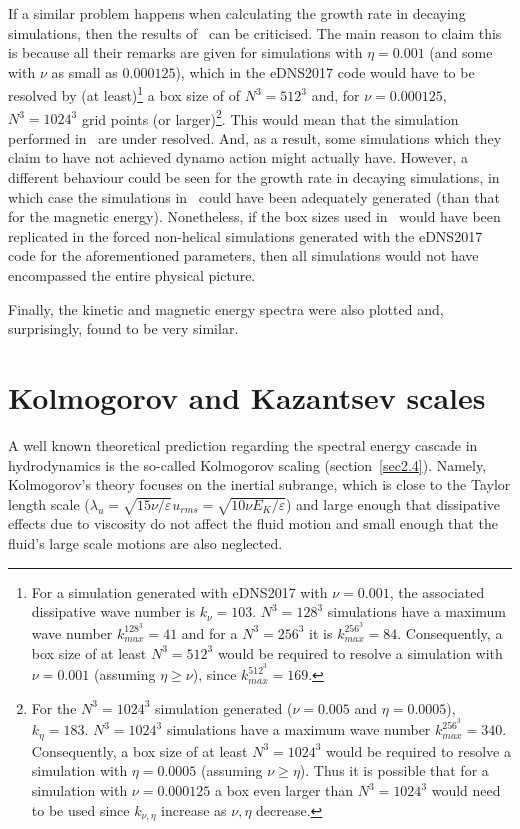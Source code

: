 \documentclass[12pt,a4paper]{report}
\begin{document}
If a similar problem happens when calculating the growth rate in decaying simulations, then the results of~\cite{schekochihin2004critical} can be criticised. The main reason to claim this is because all their remarks are given for simulations with $\eta=0.001$ (and some with $\nu$ as small as $0.000125$), which in the eDNS2017 code would have to be resolved by (at least)\footnote{For a simulation generated with eDNS2017 with $\nu=0.001$, the associated dissipative wave number is $k_\nu=103$. $N^3=128^3$ simulations have a maximum wave number $k_{max}^{128^3}=41$ and for a $N^3=256^3$ it is $k_{max}^{256^3}=84$. Consequently, a box size of at least $N^3=512^3$ would be required to resolve a simulation with $\nu=0.001$ (assuming $\eta \geq \nu$), since $k_{max}^{512^3}=169$.} a box size of of $N^3=512^3$ and, for $\nu=0.000125$, $N^3=1024^3$ grid points (or larger)\footnote{For the $N^3=1024^3$ simulation generated ($\nu=0.005$ and $\eta=0.0005$), $k_\eta=183$. $N^3=1024^3$ simulations have a maximum wave number $k_{max}^{256^3}=340$. Consequently, a box size of at least $N^3=1024^3$ would be required to resolve a simulation with $\eta=0.0005$ (assuming $\nu \geq \eta$). Thus it is possible that for a simulation with $\nu=0.000125$ a box even larger than $N^3=1024^3$ would need to be used since $k_{\nu, \eta}$ increase as $\nu, \eta$ decrease.}. This would mean that the simulation performed in~\cite{schekochihin2004critical} are under resolved. And, as a result, some simulations which they claim to have not achieved dynamo action might actually have.  However, a different behaviour could be seen for the growth rate in decaying simulations, in which case the simulations in~\cite{schekochihin2004critical} could have been adequately generated (than that for the magnetic energy). Nonetheless, if the box sizes used in~\cite{schekochihin2004critical} would have been replicated in the forced non-helical simulations generated with the eDNS2017 code for the aforementioned parameters, then all simulations would not have encompassed the entire physical picture. 

Finally, the kinetic and magnetic energy spectra were also plotted and, surprisingly, found to be very similar.

\section{Kolmogorov and Kazantsev scales}

A well known theoretical prediction regarding the spectral energy cascade in hydrodynamics is the so-called Kolmogorov scaling (section~\ref{sec2.4}). Namely, Kolmogorov's theory focuses on the inertial subrange, which is close to the Taylor length scale ($\lambda_u=\sqrt{15\nu/\varepsilon}u_{rms}=\sqrt{10\nu E_K/\varepsilon}$) and large enough that dissipative effects due to viscosity do not affect the fluid motion and small enough that the fluid's large scale motions are also neglected. 
\end{document}
